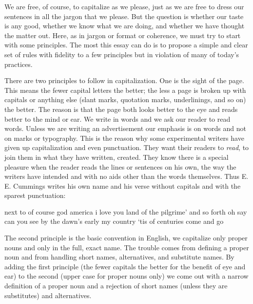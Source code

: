 \documentclass[
    oneside,
    11pt,
]{memoir}
\begin{document}
We are free, of course, to capitalize as we please, just as we are free to dress our sentences in all the jargon that we please. But the question is whether our taste is any good, whether we know what we are doing, and whether we have thought the matter out. Here, as in jargon or format or coherence, we must try to start with some principles. The most this essay can do is to propose a simple and clear set of rules with fidelity to a few principles but in violation of many of today's practices.

There are two principles to follow in capitalization. One is the sight of the page. This means the fewer capital letters the better; the less a page is broken up with capitals or anything else (slant marks, quotation marks, underlinings, and so on) the better. The reason is that the page both looks better to the eye and reads better to the mind or ear. We write in words and we ask our reader to read words. Unless we are writing an advertisement our emphasis is on words and not on marks or typography. This is the reason why some experimental writers have given up capitalization and even punctuation. They want their readers to \emph{read}, to join them in what they have written, created. They know there is a special pleasure when the reader reads the lines or sentences on his own, the way the writers have intended and with no aids other than the words themselves. Thus E. E. Cummings writes his own name and his verse without capitals and with the sparest punctuation:

\begin{displayquote}
next to of course god america
i love you land of the pilgrime' and so forth oh
say can you see by the dawn's early my
country `tis of centuries come and go
\end{displayquote}

The second principle is the basic convention in English, we capitalize only proper nouns and only in the full, exact name. The trouble comes from defining a proper noun and from handling short names, alternatives, and substitute names. By adding the first principle (the fewer capitals the better for the benefit of eye and ear) to the second (upper case for proper nouns only) we come out with a narrow definition of a proper noun and a rejection of short names (unless they are substitutes) and alternatives. 
\end{document}
